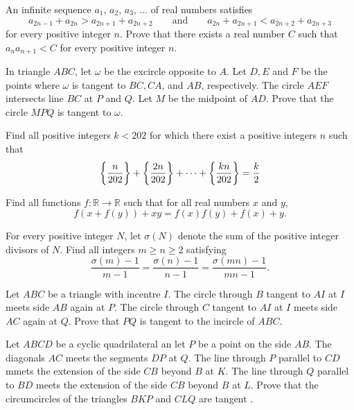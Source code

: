\documentclass[11pt]{scrartcl}
\begin{document}
\begin{problem}[8126547357118301633]
An infinite sequence $a_1$, $a_2$, $a_3$, $\ldots$ of real numbers satisfies
\[
a_{2n-1} + a_{2n} > a_{2n+1} + a_{2n+2} \qquad \mbox{and} \qquad a_{2n} + a_{2n+1} < a_{2n+2} + a_{2n+3}
\]for every positive integer $n$. Prove that there exists a real number $C$ such that $a_{n} a_{n+1} < C$ for every positive integer $n$.
\end{problem}
\begin{problem}[199006625390154]
In triangle $ABC$, let $\omega$ be the excircle opposite to $A$. Let $D, E$ and $F$ be the points where $\omega$ is tangent to $BC, CA$, and $AB$, respectively. The circle $AEF$ intersects line $BC$ at $P$ and $Q$. Let $M$ be the midpoint of $AD$. Prove that the circle $MPQ$ is tangent to $\omega$.
\end{problem}
\begin{problem}[680158311639624]
Find all positive integers $k<202$ for which there exist a positive integers $n$ such that
$$\bigg {\{}\frac{n}{202}\bigg {\}}+\bigg {\{}\frac{2n}{202}\bigg {\}}+\cdots +\bigg {\{}\frac{kn}{202}\bigg {\}}=\frac{k}{2}$$
\end{problem}
\begin{problem}[106666027438734]
Find all functions $f : \mathbb{R}\to\mathbb{R}$ such that for all real numbers $x$ and $y$,
$$f(x+f(y))+xy=f(x)f(y)+f(x)+y.$$
\end{problem}
\begin{problem}[1612300762204186997]
For every positive integer $N$, let $\sigma(N)$ denote the sum of the positive integer divisors of $N$. Find all integers $m\geq n\geq 2$ satisfying\[\frac{\sigma(m)-1}{m-1}=\frac{\sigma(n)-1}{n-1}=\frac{\sigma(mn)-1}{mn-1}.\]
\end{problem}
\begin{problem}[613302970238472]
	Let $ABC$ be a triangle with incentre $I$. The circle through $B$ tangent to $AI$ at $I$ meets side $AB$ again at $P$. The circle through $C$ tangent to $AI$ at $I$ meets side $AC$ again at $Q$. Prove that $PQ$ is tangent to the incircle of $ABC.$
\end{problem}
\begin{problem}[3032245772349874005]
	Let $ABCD$ be a cyclic quadrilateral an let $P$ be a point on the side $AB.$ The diagonals $AC$ meets the segments $DP$ at $Q.$ The line through $P$ parallel to $CD$ mmets the extension of the side $CB$ beyond $B$ at $K.$ The line through $Q$ parallel to $BD$ meets the extension of the side $CB$ beyond $B$ at $L.$ Prove that the circumcircles of the triangles $BKP$ and $CLQ$ are tangent .
\end{problem}
\end{document}
